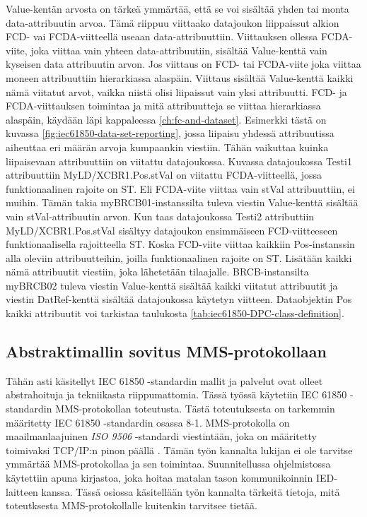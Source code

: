 Value-kentän arvosta on tärkeä ymmärtää, että se voi sisältää yhden tai monta data-att\-ri\-buu\-tin arvoa. Tämä riippuu viittaako datajoukon liippaissut alkion FCD- vai FCDA-viitteellä useaan data-attribuuttiin. Viittauksen ollessa FCDA-viite, joka viittaa vain yhteen data-attribuutiin, sisältää Value-kenttä vain kyseisen data attribuutin arvon. Jos viittaus on FCD- tai FCDA-viite joka viittaa moneen attribuuttiin hierarkiassa alaspäin. Viittaus sisältää Value-kenttä kaikki nämä viitatut arvot, vaikka niistä olisi liipaissut vain yksi attribuutti. FCD- ja FCDA-viittauksen toimintaa ja mitä attribuutteja se viittaa hierarkiassa alaspäin, käydään läpi kappaleessa \ref{ch:fc-and-dataset}. Esimerkki tästä on kuvassa \ref{fig:iec61850-data-set-reporting}, jossa liipaisu yhdessä attribuutissa aiheuttaa eri määrän arvoja kumpaankin viestiin. Tähän vaikuttaa kuinka liipaisevaan attribuuttiin on viitattu datajoukossa. Kuvassa datajoukossa Testi1 attribuuttiin MyLD/XCBR1.Pos.stVal on viitattu FCDA-viitteellä, jossa funktionaalinen rajoite on ST. Eli FCDA-viite viittaa vain stVal attribuuttiin, ei muihin. Tämän takia myBRCB01-instanssilta tuleva viestin Value-kenttä sisältää vain stVal-attribuutin arvon. Kun taas datajoukossa Testi2 attributtiin MyLD/XCBR1.Pos.stVal sisältyy datajoukon ensimmäiseen FCD-viitteeseen funktionaalisella rajoitteella ST. Koska FCD-viite viittaa kaikkiin Pos-instanssin alla oleviin attribuutteihin, joilla funktionaalinen rajoite on ST. Lisätään kaikki nämä attribuutit viestiin, joka lähetetään tilaajalle. BRCB-instansilta myBRCB02 tuleva viestin Value-kenttä sisältää kaikki viitatut attribuutit ja viestin DatRef-kenttä sisältää datajoukossa käytetyn viitteen. Dataobjektin Pos kaikki attribuutit voi tarkistaa taulukosta \ref{tab:iec61850-DPC-class-definition}. \mbox{\cite[s.~40--44]{IEC61850-7-1}} \mbox{\cite[s.~108]{IEC61850-7-2}}

\subsection{Abstraktimallin sovitus MMS-protokollaan}
\label{ch:iec61850-mms-mallinnus}
Tähän asti käsitellyt IEC 61850 -standardin mallit ja palvelut ovat olleet abstrahoituja ja tekniikasta riippumattomia. Tässä työssä käytetiin IEC 61850 -standardin MMS-protokollan toteutusta. Tästä toteutuksesta on tarkemmin määritetty IEC 61850 -stan\-dar\-din osassa 8-1. MMS-protokolla on maailmanlaajuinen \emph{ISO 9506} -standardi viestintään, joka on määritetty toimivaksi TCP/IP:n pinon päällä \mbox{\cite{MMS-protocol-stack-and-API}}. Tämän työn kannalta lukijan ei ole tarvitse ymmärtää MMS-protokollaa ja sen toimintaa. Suunnitellussa ohjelmistossa käytettiin apuna kirjastoa, joka hoitaa matalan tason kommunikoinnin IED-laitteen kanssa. Tässä osiossa käsitellään työn kannalta tärkeitä tietoja, mitä toteutksesta MMS-protokollalle kuitenkin tarvitsee tietää. \mbox{\cite{Introduction-to-the-MMS}}

